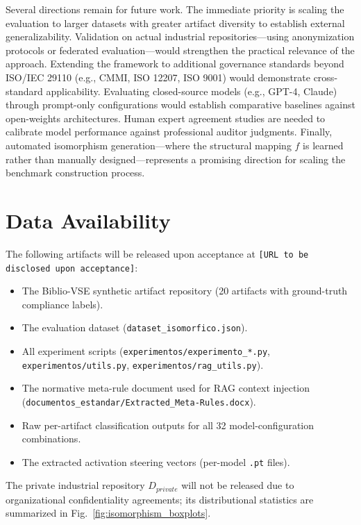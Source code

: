 \documentclass{ieeeaccess}
\begin{document}
Several directions remain for future work. The immediate priority is scaling the evaluation to larger datasets with greater artifact diversity to establish external generalizability. Validation on actual industrial repositories---using anonymization protocols or federated evaluation---would strengthen the practical relevance of the approach. Extending the framework to additional governance standards beyond ISO/IEC 29110 (e.g., CMMI, ISO 12207, ISO 9001) would demonstrate cross-standard applicability. Evaluating closed-source models (e.g., GPT-4, Claude) through prompt-only configurations would establish comparative baselines against open-weights architectures. Human expert agreement studies are needed to calibrate model performance against professional auditor judgments. Finally, automated isomorphism generation---where the structural mapping $f$ is learned rather than manually designed---represents a promising direction for scaling the benchmark construction process.


\section*{Data Availability}

The following artifacts will be released upon acceptance at \texttt{[URL to be disclosed upon acceptance]}:
\begin{itemize}
    \item The Biblio-VSE synthetic artifact repository (20 artifacts with ground-truth compliance labels).
    \item The evaluation dataset (\texttt{dataset\_isomorfico.json}).
    \item All experiment scripts (\texttt{experimentos/experimento\_*.py}, \texttt{experimentos/utils.py}, \texttt{experimentos/rag\_utils.py}).
    \item The normative meta-rule document used for RAG context injection (\texttt{documentos\_estandar/Extracted\_Meta-Rules.docx}).
    \item Raw per-artifact classification outputs for all 32 model-configuration combinations.
    \item The extracted activation steering vectors (per-model \texttt{.pt} files).
\end{itemize}
The private industrial repository $D_{private}$ will not be released due to organizational confidentiality agreements; its distributional statistics are summarized in Fig.~\ref{fig:isomorphism_boxplots}.



\end{document}
